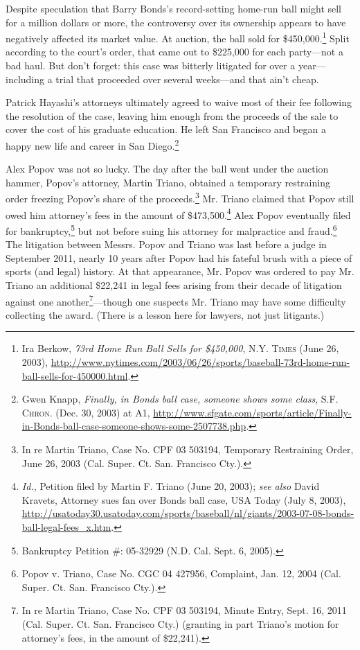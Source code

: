 Despite speculation that Barry Bonds's record-setting home-run ball might sell
for a million dollars or more, the controversy over its ownership appears to
have negatively affected its market value. At auction, the ball sold for
\$450,000.\footnote{Ira Berkow, \textit{73rd Home Run Ball Sells for \$450,000},
\textsc{N.Y. Times} (June 26, 2003),
\url{http://www.nytimes.com/2003/06/26/sports/baseball-73rd-home-run-ball-sells-for-450000.html}.}
Split according to the court's order, that came out to \$225,000 for each
party---not a bad haul. But don't forget: this case was bitterly litigated for
over a year---including a trial that proceeded over several weeks---and that
ain't cheap. 

Patrick Hayashi's attorneys ultimately agreed to waive most of their fee
following the resolution of the case, leaving him enough from the proceeds of
the sale to cover the cost of his graduate education. He left San Francisco and
began a happy new life and career in San Diego.\footnote{Gwen Knapp,
\textit{Finally, in Bonds ball case, someone shows some class}, \textsc{S.F.
Chron.} (Dec. 30, 2003) at A1,
\url{http://www.sfgate.com/sports/article/Finally-in-Bonds-ball-case-someone-shows-some-2507738.php}.}

Alex Popov was not so lucky. The day after the ball went under the auction
hammer, Popov's attorney, Martin Triano, obtained a temporary restraining order
freezing Popov's share of the proceeds.\footnote{In re Martin Triano, Case No.
CPF 03 503194, Temporary Restraining Order, June 26, 2003 (Cal. Super. Ct. San.
Francisco Cty.).} Mr. Triano claimed that Popov still owed him attorney's fees
in the amount of \$473,500.\footnote{\textit{Id.}, Petition filed by Martin F.
Triano (June 20, 2003); \textit{see also} David Kravets, Attorney sues fan over
Bonds ball case, USA Today (July 8, 2003),
\url{http://usatoday30.usatoday.com/sports/baseball/nl/giants/2003-07-08-bonds-ball-legal-fees\_x.htm}.}
Alex Popov eventually filed for bankruptcy,\footnote{Bankruptcy Petition \#:
05-32929 (N.D. Cal. Sept. 6, 2005).} but not before suing his attorney for
malpractice and fraud.\footnote{Popov v. Triano, Case No. CGC 04 427956,
Complaint, Jan. 12, 2004 (Cal. Super. Ct. San. Francisco Cty.).} The litigation
between Messrs. Popov and Triano was last before a judge in September 2011,
nearly 10 years after Popov had his fateful brush with a piece of sports (and
legal) history. At that appearance, Mr. Popov was ordered to pay Mr. Triano an
additional \$22,241 in legal fees arising from their decade of litigation
against one another\footnote{In re Martin Triano, Case No. CPF 03 503194, Minute
Entry, Sept. 16, 2011 (Cal. Super. Ct. San. Francisco Cty.) (granting in part
Triano's motion for attorney's fees, in the amount of \$22,241).}---though
one suspects Mr. Triano may have some difficulty collecting the award. (There is
a lesson here for lawyers, not just litigants.)

